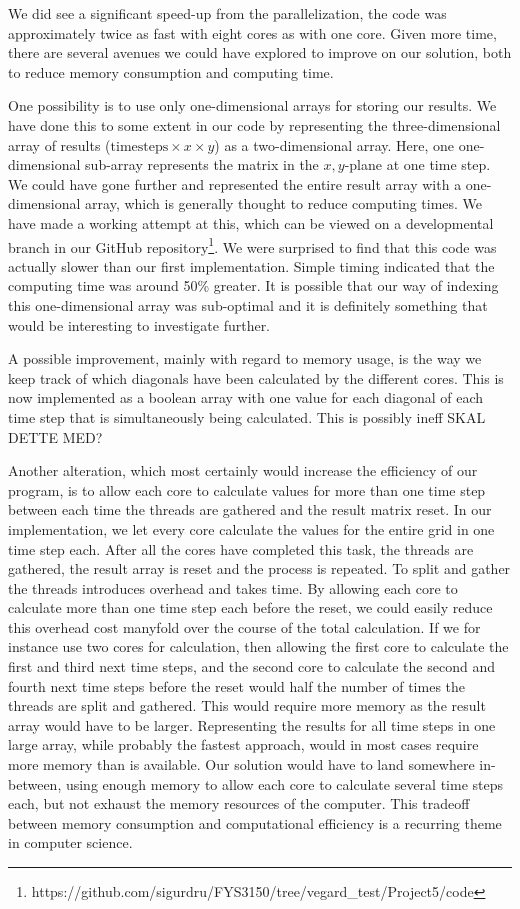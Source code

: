 \documentclass[reprint, english,notitlepage,nofootinbib]{revtex4-1}  %
\begin{document}
We did see a significant speed-up from the parallelization, the code was approximately twice as fast with eight cores as with one core. Given more time, there are several avenues we could have explored to improve on our solution, both to reduce memory consumption and computing time.

One possibility is to use only one-dimensional arrays for storing our results. We have done this to some extent in our code by representing the three-dimensional array of results (\(\text{timesteps} \times x \times y\)) as a two-dimensional array. Here, one one-dimensional sub-array represents the matrix in the \(x, y\)-plane at one time step. We could have gone further and represented the entire result array with a one-dimensional array, which is generally thought to reduce computing times. We have made a working attempt at this, which can be viewed on a developmental branch in our GitHub repository\footnote{https://github.com/sigurdru/FYS3150/tree/vegard\_test/Project5/code}. We were surprised to find that this code was actually slower than our first implementation. Simple timing indicated that the computing time was around 50\% greater. It is possible that our way of indexing this one-dimensional array was sub-optimal and it is definitely something that would be interesting to investigate further.

A possible improvement, mainly with regard to memory usage, is the way we keep track of which diagonals have been calculated by the different cores. This is now implemented as a boolean array with one value for each diagonal of each time step that is simultaneously being calculated. This is possibly ineff SKAL DETTE MED?

Another alteration, which most certainly would increase the efficiency of our program, is to allow each core to calculate values for more than one time step between each time the threads are gathered and the result matrix reset. In our implementation, we let every core calculate the values for the entire grid in one time step each. After all the cores have completed this task, the threads are gathered, the result array is reset and the process is repeated. To split and gather the threads introduces overhead and takes time. By allowing each core to calculate more than one time step each before the reset, we could easily reduce this overhead cost manyfold over the course of the total calculation. If we for instance use two cores for calculation, then allowing the first core to calculate the first and third next time steps, and the second core to calculate the second and fourth next time steps before the reset would half the number of times the threads are split and gathered. This would require more memory as the result array would have to be larger. Representing the results for all time steps in one large array, while probably the fastest approach, would in most cases require more memory than is available. Our solution would have to land somewhere in-between, using enough memory to allow each core to calculate several time steps each, but not exhaust the memory resources of the computer. This tradeoff between memory consumption and computational efficiency is a recurring theme in computer science.
\end{document}
